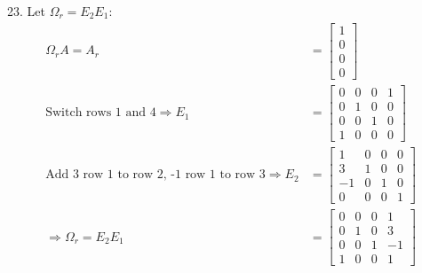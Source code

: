 \documentclass[11pt]{homework}
\begin{document}
23. Let $\Omega_r = E_2 E_1$:
\begin{align*}
\Omega_r A = A_r &=
  \begin{bmatrix}
  1 \\
  0 \\
  0 \\
  0
  \end{bmatrix}\\
\text{Switch rows 1 and 4}
\Rightarrow
E_1 &= 
  \begin{bmatrix}
  0 & 0 & 0 & 1 \\
  0 & 1 & 0 & 0 \\
  0 & 0 & 1 & 0 \\
  1 & 0 & 0 & 0 
  \end{bmatrix}\\
\text{Add 3 row 1 to row 2, -1 row 1 to row 3}
\Rightarrow
E_2 &=
  \begin{bmatrix}
  1 & 0 & 0 & 0 \\
  3 & 1 & 0 & 0 \\
  -1 & 0 & 1 & 0 \\
  0 & 0 & 0 & 1 
  \end{bmatrix} \\
\Rightarrow
\Omega_r = E_2 E_1 &=
  \begin{bmatrix}
  0 & 0 & 0 & 1 \\
  0 & 1 & 0 & 3 \\
  0 & 0 & 1 & -1 \\
  1 & 0 & 0 & 1 
  \end{bmatrix}
\end{align*}
\end{document}
